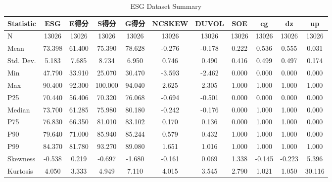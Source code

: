 \begin{landscape}
\begin{table}[htbp]
\centering
\caption{ESG Dataset Summary}
\label{tab:descriptives}
\begin{tabular}{l*{10}{c}}
\toprule
Statistic & ESG & E得分 & S得分 & G得分 & NCSKEW & DUVOL & SOE & cg & dz & up \\
\midrule
N &        13026 &        13026 &        13026 &        13026 &        13026 &        13026 &        13026 &        13026 &        13026 &        13026 \\
Mean &    73.398 &    61.400 &    75.390 &    78.628 &    -0.276 &    -0.178 &     0.222 &     0.536 &     0.555 &     0.031 \\
Std. Dev. &     5.183 &     7.685 &     8.734 &     6.950 &     0.746 &     0.490 &     0.416 &     0.499 &     0.497 &     0.174 \\
Min &    47.790 &    33.910 &    25.070 &    30.470 &    -3.593 &    -2.462 &     0.000 &     0.000 &     0.000 &     0.000 \\
Max &    90.400 &    92.300 &   100.000 &    94.040 &     2.625 &     2.305 &     1.000 &     1.000 &     1.000 &     1.000 \\
P25 &    70.440 &    56.406 &    70.320 &    76.068 &    -0.694 &    -0.501 &     0.000 &     0.000 &     0.000 &     0.000 \\
Median &    73.700 &    61.285 &    75.980 &    80.180 &    -0.242 &    -0.176 &     0.000 &     1.000 &     1.000 &     0.000 \\
P75 &    76.830 &    66.350 &    81.010 &    83.102 &     0.170 &     0.136 &     0.000 &     1.000 &     1.000 &     0.000 \\
P90 &    79.640 &    71.000 &    85.940 &    85.244 &     0.579 &     0.432 &     1.000 &     1.000 &     1.000 &     0.000 \\
P99 &    84.370 &    81.780 &    93.270 &    89.080 &     1.651 &     1.016 &     1.000 &     1.000 &     1.000 &     1.000 \\
Skewness &    -0.538 &     0.219 &    -0.697 &    -1.680 &    -0.161 &     0.069 &     1.338 &    -0.145 &    -0.223 &     5.396 \\
Kurtosis &     4.050 &     3.333 &     4.949 &     7.110 &     4.015 &     3.545 &     2.790 &     1.021 &     1.050 &    30.116 \\
\bottomrule
\end{tabular}
\end{table}
\end{landscape}